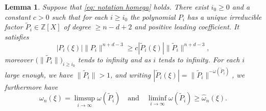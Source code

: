 \documentclass[10pt,a4paper]{amsart}
\numberwithin{equation}{section}
\newcommand\bZ{\mathbb{Z}}
\newcommand\tP{\widetilde{P}}
\newcommand\homega{\widehat{\omega}}\newcommand\HH{\mathcal{H}}
\newcommand{\normH}[1]{\|#1\|}
\newcommand\AND{\quad\text{and}\quad}
\theoremstyle{definition}
\theoremstyle{plain}
\newtheorem{Lem}[Def]{Lemma}
\begin{document}
\begin{Lem}
\label{lem: existence facteur irreductible grand}
Suppose that \eqref{eq: notation homega} holds. There exist $i_0\geq 0$ and a constant $c>0$ such that for each $i\geq i_0$ the polynomial $P_i$ has a unique irreducible factor $\tP_i\in\bZ[X]$ of degree $\geq n-d+2$ and positive leading coefficient. It satisfies
\begin{equation}
\label{eq lem: existence facteur irr grand eq 2}
|P_i(\xi)| \normH{P_i}^{n+d-3} \geq c|\tP_i(\xi)| \normH{\tP_i}^{n+d-3},
\end{equation}
moreover $\big(\normH{\tP_i}\big)_{i\geq i_0}$ tends to infinity and as $i$ tends to infinity. For each $i$ large enough, we have $\normH{\tP_i}>1$, and writing $|\tP_i(\xi)| = \normH{\tP_i}^{-\omega(\tP_i)}$, we furthermore have
\begin{equation}
\label{eq lem: existence facteur irr grand eq 1}
\omega_n(\xi) = \limsup_{i\to\infty} \omega(\tP_i) \AND \liminf_{i\to\infty} \omega(\tP_i) \geq \homega_n(\xi).
\end{equation}
\end{Lem}
\end{document}
